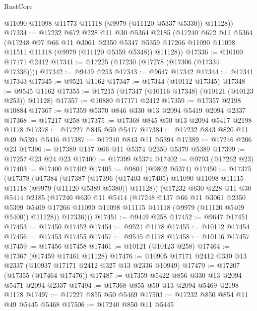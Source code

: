 \begin{lexlean}{RustCore}
\begin{coremodule}
        @11090
        @11098
        @11773
        @11118
        (@9979 (@11120 @5337 @5330))
        @11128))
@17334 := @17232
    @672
    @228
    @11
    @30
    @5364
    @2185
    (@17240
      @672
      @11
      @5364
      (@17248
        @97
        @66
        @11
        @3061
        @2350
        @5347
        @5359
        @17266
        @11090
        @11098
        @11511
        @11118
        (@9979 (@11120 @5359 @5348))
        @11128))
@17336 := @10100 @17171 @2412
@17341 := @17225 (@17230 (@17278 (@17306 (@17334 @17336))))
@17342 := @9449 @253
@17343 := @9647 @17342
@17344 := @17341 @17343
@17345 := @9521 @1162
@17347 := @17344 (@10112 @17345)
@17348 := @9545 @1162
@17355 := @17215 (@17347 (@10116 @17348) (@10121 (@10123 @253)) @11128)
@17357 := @10880 @17171 @2412
@17359 := @17357 @2198 @10884
@17367 := @17359 @5370 @846 @330 @13 @2094 @5419 @2094 @2337
@17368 := @17217 @258
@17375 := @17368 @845 @50 @13 @2094 @5417 @2198 @1178
@17378 := @17227 @845 @50 @5417
@17384 := @17232 @843 @820 @11 @49 @5394 @5416
@17387 := @17240 @843 @11 @5394
@17389 := @17246 @206 @23
@17396 := @17389 @137 @66 @11 @5374 @2350 @5379 @5389
@17399 := @17257 @23 @24 @23
@17400 := @17399 @5374
@17402 := @9793 (@17262 @23)
@17403 := @17400 @17402
@17405 := @9801 (@9802 @5374)
@17450 := @17375
    (@17378
      (@17384
        (@17387
          (@17396 (@17403 @17405) @11090 @11098 @11115 @11118 (@9979 (@11120 @5389 @5380)) @11128))
        (@17232
          @630
          @228
          @11
          @30
          @5414
          @2185
          (@17240
            @630
            @11
            @5414
            (@17248
              @137
              @66
              @11
              @3061
              @2350
              @5399
              @5409
              @17266
              @11090
              @11098
              @11115
              @11118
              (@9979 (@11120 @5409 @5400))
              @11128))
          @17336)))
@17451 := @9449 @258
@17452 := @9647 @17451
@17453 := @17450 @17452
@17454 := @9521 @1178
@17455 := @10112 @17454
@17456 := @17453 @17455
@17457 := @9545 @1178
@17458 := @10116 @17457
@17459 := @17456 @17458
@17461 := @10121 (@10123 @258)
@17464 := @17367 (@17459 @17461 @11128)
@17476 := @10905 @17171 @2412 @330 @13 @2337 (@10937 @17171 @2412 @327 @13 @2336 @10949)
@17479 := @17207 (@17355 (@17464 @17476))
@17487 := @17359 @5422 @856 @330 @13 @2094 @5471 @2094 @2337
@17494 := @17368 @855 @50 @13 @2094 @5469 @2198 @1178
@17497 := @17227 @855 @50 @5469
@17503 := @17232 @850 @854 @11 @49 @5445 @5468
@17506 := @17240 @850 @11 @5445

\end{coremodule}
\end{lexlean}
